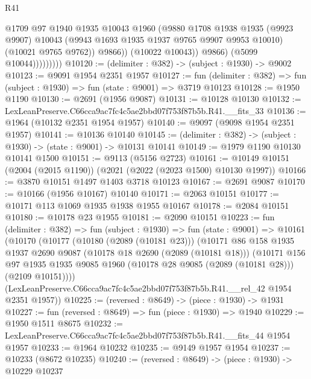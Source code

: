 \begin{lexlean}{R41}
\begin{coremodule}
                            @1709
                            @97
                            @1940
                            @1935
                            @10043
                            @1960
                            (@9880
                              @1708
                              @1938
                              @1935
                              (@9923 @9907)
                              @10043
                              (@9943 @1693 @1935 @1937 @9765 @9907 @9953 @10010)
                              (@10021 @9765 @9762))
                            @9866))
                        (@10022 @10043))
                      @9866)
                    (@5099 @10044)))))))))
@10120 := (delimiter : @382) -> (subject : @1930) -> @9002
@10123 := @9091 @1954 @2351 @1957
@10127 := fun (delimiter : @382) => fun (subject : @1930) => fun (state : @9001) => @3719 @10123
@10128 := @1950 @1190
@10130 := @2691 (@1956 @9087)
@10131 := @10128 @10130
@10132 := LexLeanPreserve.C66cca9ac7fc4c5ae2bbd07f753f87b5b.R41.__fits_33
@10136 := @1964 (@10132 @2351 @1954 @1957)
@10140 := @9097 (@9098 @1954 @2351 @1957)
@10141 := @10136 @10140
@10145 := (delimiter : @382) -> (subject : @1930) -> (state : @9001) -> @10131 @10141
@10149 := @1979 @1190 @10130 @10141 @1500
@10151 := @9113 (@5156 @2723)
@10161 := @10149 @10151 (@2004 (@2015 @1190)) (@2021 (@2022 (@2023 @1500) @10130 @1997))
@10166 := @3870 @10151 @1497 @1403 @3718 @10123
@10167 := @2691 @9087
@10170 := @10166 (@1956 @10167) @10140
@10171 := @2063 @10151
@10177 := @10171 @113 @1069 @1935 @1938 @1955 @10167
@10178 := @2084 @10151
@10180 := @10178 @23 @1955
@10181 := @2090 @10151
@10223 := fun (delimiter : @382) =>
  fun (subject : @1930) =>
  fun (state : @9001) =>
  @10161
    (@10170
      (@10177
        (@10180 (@2089 (@10181 @23)))
        (@10171
          @86
          @158
          @1935
          @1937
          @2690
          @9087
          (@10178 @18 @2690 (@2089 (@10181 @18)))
          (@10171
            @156
            @97
            @1935
            @1935
            @9085
            @1960
            (@10178 @28 @9085 (@2089 (@10181 @28)))
            (@2109 @10151))))
      (LexLeanPreserve.C66cca9ac7fc4c5ae2bbd07f753f87b5b.R41.__rel_42 @1954 @2351 @1957))
@10225 := (reversed : @8649) -> (piece : @1930) -> @1931
@10227 := fun (reversed : @8649) => fun (piece : @1930) => @1940
@10229 := @1950 @1511 @8675
@10232 := LexLeanPreserve.C66cca9ac7fc4c5ae2bbd07f753f87b5b.R41.__fits_44 @1954 @1957
@10233 := @1964 @10232
@10235 := @9149 @1957 @1954
@10237 := @10233 (@8672 @10235)
@10240 := (reversed : @8649) -> (piece : @1930) -> @10229 @10237

\end{coremodule}
\end{lexlean}
